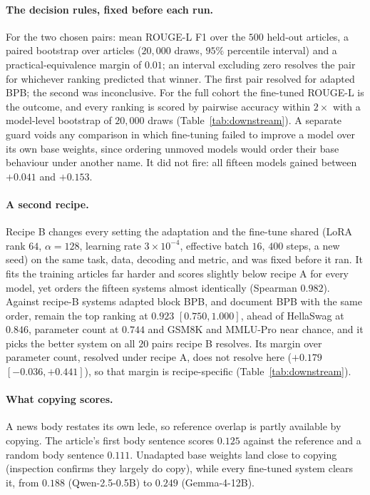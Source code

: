 \documentclass[10pt]{article}
\begin{document}
\paragraph{The decision rules, fixed before each run.} For the two chosen pairs: mean ROUGE-L F1
over the $500$ held-out articles, a paired bootstrap over articles ($20{,}000$ draws, $95\%$ percentile
interval) and a practical-equivalence margin of $0.01$; an interval excluding zero resolves the pair
for whichever ranking predicted that winner. The first pair resolved for adapted BPB; the second was
inconclusive. For the full cohort the fine-tuned ROUGE-L is the outcome, and every ranking is scored
by pairwise accuracy within $2\times$ with a model-level bootstrap of $20{,}000$ draws
(Table~\ref{tab:downstream}). A separate guard voids any comparison in which fine-tuning failed to
improve a model over its own base weights, since ordering unmoved models would order their base
behaviour under another name. It did not fire: all fifteen models gained between $+0.041$ and
$+0.153$.

\paragraph{A second recipe.} Recipe B changes every setting the adaptation and the fine-tune shared
(LoRA rank $64$, $\alpha{=}128$, learning rate $3\times10^{-4}$, effective batch $16$, $400$ steps, a
new seed) on the same task, data, decoding and metric, and was fixed before it ran. It fits the
training articles far harder and scores slightly below recipe A for every model, yet orders the
fifteen systems almost identically (Spearman $0.982$). Against recipe-B systems adapted block BPB,
and document BPB with the same order, remain the top ranking at $0.923$ $[0.750, 1.000]$, ahead of HellaSwag at $0.846$, parameter count at $0.744$
and GSM8K and MMLU-Pro near chance, and it picks the better system on all $20$ pairs recipe B
resolves. Its margin over parameter count, resolved under recipe A, does not resolve here ($+0.179$
$[-0.036, +0.441]$), so that margin is recipe-specific (Table~\ref{tab:downstream}).

\paragraph{What copying scores.} A news body restates its own lede, so reference overlap is partly
available by copying. The article's first body sentence scores $0.125$ against the reference and a
random body sentence $0.111$. Unadapted base weights land close to copying (inspection confirms they
largely do copy), while every fine-tuned system clears it, from $0.188$ (Qwen-2.5-0.5B) to $0.249$
(Gemma-4-12B).
\end{document}
